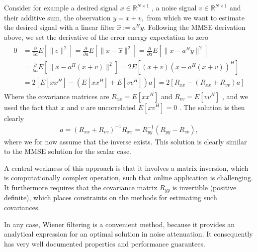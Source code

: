 \documentclass[letterpaper,10pt,english]{jupyterBook}
\begin{document}
\sphinxAtStartPar
Consider for example a desired signal \( x\in{\mathbb R}^{N \times1}
\) , a noise signal \( v\in{\mathbb R}^{N \times1} \) and their
additive sum, the observation \( y = x+v, \) from which we want to
estimate the desired signal with a linear filter \( \hat x := a^H y.
\) Following the MMSE derivation above, we set the derivative of the
error energy expectation to zero
\begin{equation*}
\begin{split} \begin{split} 0&=\frac{\partial}{\partial
a}E\left[\|e\|^2\right] =\frac{\partial}{\partial
a}E\left[\|x-\hat x\|^2\right] =\frac{\partial}{\partial
a}E\left[\|x-a^H y\|^2\right] \\& =\frac{\partial}{\partial
a}E\left[\|x-a^H (x+v)\|^2\right] =2E\left[(x+v)\left(x-a^H
(x+v)\right)^H\right] \\& =2\left[ E[xx^H] - \left(E[xx^H] +
E[vv^H]\right)a\right] =2\left[ R_{xx} - \left(R_{xx} +
R_{vv}\right)a\right] \end{split} \end{split}
\end{equation*}
\sphinxAtStartPar
Where the covariance matrices are \( R_{xx} = E[xx^H] \) and \(
R_{vv} = E[vv^H] \) , and we used the fact that \(x\) and \(v\) are
uncorrelated \( E[xv^H]=0 \) . The solution is then clearly
\begin{equation*}
\begin{split} a=\left(R_{xx}+R_{vv}\right)^{-1} R_{xx} = R_{yy}^{-1}
\left(R_{yy}-R_{vv}\right), \end{split}
\end{equation*}
\sphinxAtStartPar
where we for now assume that the inverse exists. This solution is
clearly similar to the MMSE solution for the scalar case.

\sphinxAtStartPar
A central weakness of this approach is that it involves a matrix
inversion, which is computationally complex operation, such that on\sphinxhyphen{}line
application is challenging. It furthermore requires that the covariance
matrix \(R_{yy}\) is invertible (positive definite), which places
constraints on the methods for estimating such covariances.

\sphinxAtStartPar
In any case, Wiener filtering is a convenient method, because it
provides an analytical expression for an optimal solution in noise
attenuation. It consequently has very well documented properties and
performance guarantees.
\end{document}
